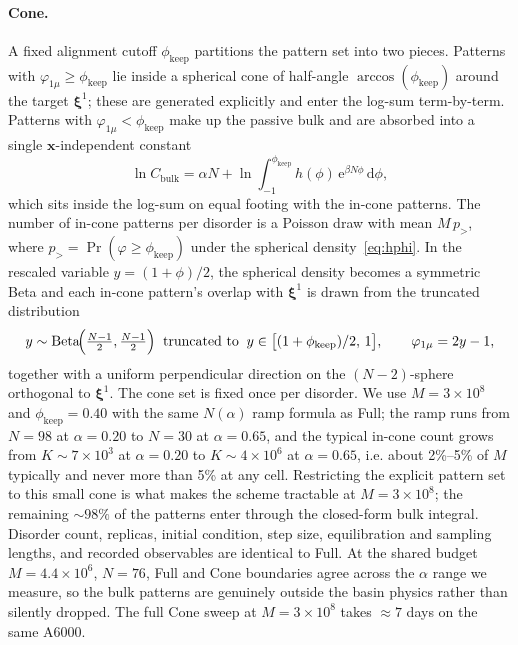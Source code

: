 \documentclass[letterpaper]{article} %
\newcommand{\bxi}{\boldsymbol{\xi}}
\newcommand{\bx}{\bm{x}}
\newcommand{\e}{{\mathrm{e}}}
\newcommand{\dd}{{\mathrm{d}}}
\newcommand{\Bnet}{\beta}
\begin{document}
\paragraph{Cone.}
A fixed alignment cutoff $\phi_{\mathrm{keep}}$ partitions the pattern
set into two pieces.  Patterns with $\varphi_{1\mu} \geq \phi_{\mathrm{keep}}$
lie inside a spherical cone of half-angle $\arccos(\phi_{\mathrm{keep}})$
around the target $\bxi^1$; these are generated explicitly and enter the
log-sum term-by-term.  Patterns with $\varphi_{1\mu} < \phi_{\mathrm{keep}}$
make up the passive bulk and are absorbed into a single
$\bx$-independent constant
\begin{equation}
\ln C_{\mathrm{bulk}} = \alpha N + \ln \!\int_{-1}^{\phi_{\mathrm{keep}}}
 h(\phi)\,\e^{\Bnet N \phi}\,\dd\phi,
\label{eq:cbulk}
\end{equation}
which sits inside the log-sum on equal footing with the in-cone patterns.
The number of in-cone patterns per disorder is a Poisson draw with mean
$M\,p_{>}$, where $p_{>} = \Pr(\varphi \geq \phi_{\mathrm{keep}})$ under
the spherical density~\eqref{eq:hphi}.  In the rescaled variable
$y = (1 + \phi)/2$, the spherical density becomes a symmetric Beta and
each in-cone pattern's overlap with $\bxi^1$ is drawn from the truncated
distribution
\begin{equation}
y \sim \mathrm{Beta}\!\Bigl(\tfrac{N-1}{2}, \tfrac{N-1}{2}\Bigr)
   \;\;\text{truncated to}\;\; y \in \bigl[(1 + \phi_{\mathrm{keep}})/2,\,1\bigr],
\qquad \varphi_{1\mu} = 2y - 1,
\label{eq:beta-tail}
\end{equation}
together with a uniform perpendicular direction on the $(N{-}2)$-sphere
orthogonal to $\bxi^1$.  The cone set is fixed once per disorder.  We
use $M = 3 \times 10^8$ and $\phi_{\mathrm{keep}} = 0.40$ with the same
$N(\alpha)$ ramp formula as Full; the ramp runs from $N = 98$ at
$\alpha = 0.20$ to $N = 30$ at $\alpha = 0.65$, and the typical in-cone
count grows from $K \sim 7 \times 10^3$ at $\alpha = 0.20$ to
$K \sim 4 \times 10^6$ at $\alpha = 0.65$, i.e. about 2\%--5\% of $M$
typically and never more than 5\% at any cell.  Restricting the explicit
pattern set to this small cone is what makes the scheme tractable at
$M = 3 \times 10^8$; the remaining $\sim 98\%$ of the patterns enter
through the closed-form bulk integral.  Disorder count, replicas, initial
condition, step size, equilibration and sampling lengths, and recorded
observables are identical to Full.  At the shared budget
$M = 4.4 \times 10^6$, $N = 76$, Full and Cone boundaries agree across
the $\alpha$ range we measure, so the bulk patterns are genuinely outside
the basin physics rather than silently dropped.  The full Cone sweep at
$M = 3 \times 10^8$ takes $\approx 7$ days on the same A6000.
\end{document}
